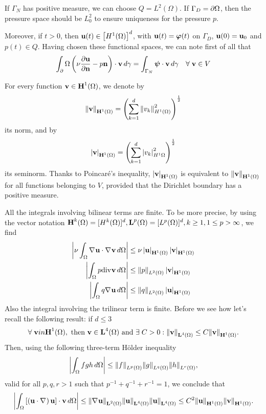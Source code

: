 If \(\Gamma_N\) has positive measure, we can choose \(Q = L^2(\Omega)\). If \(\Gamma_D = \partial\Omega\), then the pressure space should be \(L^2_0\) to ensure uniqueness for the pressure \(p\). 

Moreover, if \(t>0\), then \(\textbf{u}(t) \in \left[ H^1(\Omega) \right]^d\), with \(\textbf{u}(t) = \bm{\varphi}(t)\) on \(\Gamma_D\), \(\textbf{u}(0) = \textbf{u}_0\) and \(p(t) \in Q\). 
Having chosen these functional spaces, we can note first of all that 
\[
    \int_\boundary \left( \nu\partialderivative{\uvec}{\normal} - p\normal \right) \cdot \vvec \, d\gamma = \int_{\Gamma_N} \bm{\psi} \cdot \vvec \, d\gamma \quad \forall \; \vvec \in V
\]
\begin{notation}
    For every function \(\textbf{v} \in \textbf{H}^1(\Omega)\), we denote by 
    \[
        \norm{\textbf{v}}_{\textbf{H}^1(\Omega)} = \left( \sum_{k=1}^{d}\norm{v_k}_{H^1(\Omega)}^2 \right)^{\frac{1}{2}}
    \]
    its norm, and by 
    \[
        \left\lvert\textbf{v}\right\rvert_{\textbf{H}^1(\Omega)} = \left( \sum_{k=1}^{d} \left\lvert v_k\right\rvert_{H^1{\Omega}}^2 \right)^{\frac{1}{2}}
    \]
    its seminorm. Thanks to Poincaré's inequality, \(\left\lvert\textbf{v}\right\rvert_{\textbf{H}^1(\Omega)}\) is equivalent to \(\norm{\textbf{v}}_{\textbf{H}^1(\Omega)}\) for all functions belonging to \(V\), provided that the Dirichlet boundary has a positive measure.
\end{notation}
All the integrals involving bilinear terms are finite. To be more precise, by using the vector notation \(\textbf{H}^k(\Omega) = [H^k(\Omega)]^d, \textbf{L}^p(\Omega) = [L^p(\Omega)]^d, k \geq 1, 1\leq p > \infty\), we find 
\begin{align*}
    \abs{\nu \int_\Omega \nabla\mspace{1mu} \textbf{u} \cdot \nabla\mspace{1mu} \textbf{v} \, d\Omega} &\leq \nu \left\lvert\textbf{u}\right\rvert_{\textbf{H}^1(\Omega)} \left\lvert\textbf{v}\right\rvert_{\textbf{H}^1(\Omega)} \\
    \abs{\int_\Omega p\text{div}\mspace{1mu} \textbf{v} \, d\Omega} &\leq \norm{p}_{L^2(\Omega)} \left\lvert\textbf{v}\right\rvert_{\textbf{H}^1(\Omega)} \\
    \abs{\int_\Omega q\nabla\mspace{1mu} \textbf{u} \, d\Omega} &\leq \norm{q}_{L^2(\Omega)} \left\lvert\textbf{u}\right\rvert_{\textbf{H}^1(\Omega)}
\end{align*}
Also the integral involving the trilinear term is finite. Before we see how let's recall the following result: if \(d \leq 3\)
\[
    \forall \; \textbf{v} in \textbf{H}^1(\Omega), \text{ then } \textbf{v} \in \textbf{L}^4(\Omega) \text{ and } \exists \; C > 0 : \norm{\textbf{v}}_{\textbf{L}^4(\Omega)} \leq C \norm{\textbf{v}}_{\textbf{H}^1(\Omega)}.
\]
Then, using the following three-term Hölder inequality 
\[
    \abs{\int_\Omega fgh \, d\Omega} \leq \norm{f}_{L^p(\Omega)} \norm{g}_{L^q(\Omega)} \norm{h}_{L^r(\Omega)},
\]
valid for all \(p, q, r > 1\) such that \(p^{-1} + q^{-1} + r^{-1} = 1\), we conclude that 
\[
    \abs{\int_\Omega \left[ \left( \textbf{u} \cdot \nabla\mspace{1mu} \right) \textbf{u} \right] \cdot \textbf{v} \, d\Omega} \leq \norm{\nabla\mspace{1mu} \textbf{u}}_{\textbf{L}^2(\Omega)} \norm{\textbf{u}}_{\textbf{L}^4(\Omega)} \norm{\textbf{u}}_{\textbf{L}^4(\Omega)} \leq C^2 \norm{\textbf{u}}_{\textbf{H}^1(\Omega)}\norm{\textbf{v}}_{\textbf{H}^1(\Omega)}.
\]
